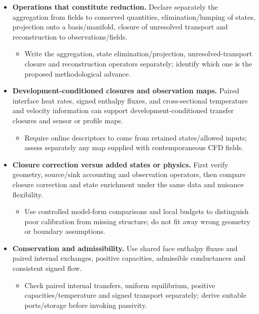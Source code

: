 \begin{itemize}[leftmargin=*]
\item {}\textbf{Operations that constitute reduction.} Declare separately the aggregation from fields to conserved quantities, elimination/\allowbreak{}lumping of states, projection onto a basis/\allowbreak{}manifold, closure of unresolved transport and reconstruction to observations/\allowbreak{}fields.
\begin{itemize}
\item Write the aggregation, state elimination/\allowbreak{}projection, unresolved-transport closure and reconstruction operators separately; identify which one is the proposed methodological advance.
\end{itemize}
\item {}\textbf{Development-conditioned closures and observation maps.} Paired interface heat rates, signed enthalpy fluxes, and cross-sectional temperature and velocity information can support development-conditioned transfer closures and sensor or profile maps.
\begin{itemize}
\item Require online descriptors to come from retained states/\allowbreak{}allowed inputs; assess separately any map supplied with contemporaneous CFD fields.
\end{itemize}
\item {}\textbf{Closure correction versus added states or physics.} First verify geometry, source/\allowbreak{}sink accounting and observation operators, then compare closure correction and state enrichment under the same data and nuisance flexibility.
\begin{itemize}
\item Use controlled model-form comparisons and local budgets to distinguish poor calibration from missing structure; do not fit away wrong geometry or boundary assumptions.
\end{itemize}
\item {}\textbf{Conservation and admissibility.} Use shared face enthalpy fluxes and paired internal exchanges, positive capacities, admissible conductances and consistent signed flow.
\begin{itemize}
\item Check paired internal transfers, uniform equilibrium, positive capacities/\allowbreak{}temperature and signed transport separately; derive suitable ports/\allowbreak{}storage before invoking passivity.
\end{itemize}
\end{itemize}

